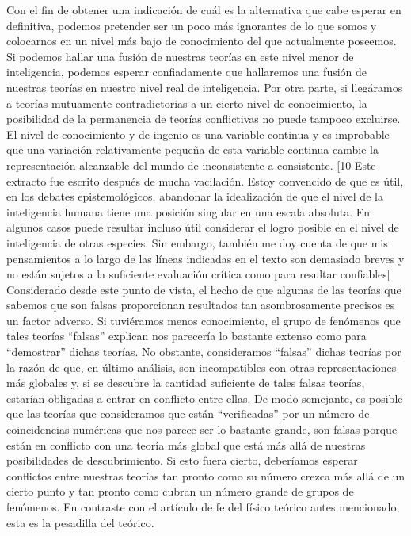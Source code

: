 \documentclass[a4paper, 12pt]{article}
\begin{document}
Con el fin de obtener una indicación de cuál es la alternativa que cabe esperar en definitiva, podemos pretender ser un poco más ignorantes de lo que somos y colocarnos en un nivel más bajo de conocimiento del que actualmente poseemos. Si podemos hallar una fusión de nuestras teorías en este nivel menor de inteligencia, podemos esperar confiadamente que hallaremos una fusión de nuestras teorías en nuestro nivel real de inteligencia. Por otra parte, si llegáramos a teorías mutuamente contradictorias a un cierto nivel de conocimiento, la posibilidad de la permanencia de teorías conflictivas no puede tampoco excluirse. El nivel de conocimiento y de ingenio es una variable continua y es improbable que una variación relativamente pequeña de esta variable continua cambie la representación alcanzable del mundo de inconsistente a consistente. [10 Este extracto fue escrito después de mucha vacilación. Estoy convencido de que es útil, en los debates epistemológicos, abandonar la idealización de que el nivel de la inteligencia humana tiene una posición singular en una escala absoluta. En algunos casos puede resultar incluso útil considerar el logro posible en el nivel de inteligencia de otras especies. Sin embargo, también me doy cuenta de que mis pensamientos a lo largo de las líneas indicadas en el texto son demasiado breves y no están sujetos a la suficiente evaluación crítica como para resultar confiables] Considerado desde este punto de vista, el hecho de que algunas de las teorías que sabemos que son falsas proporcionan resultados tan asombrosamente precisos es un factor adverso. Si tuviéramos menos conocimiento, el grupo de fenómenos que tales teorías ``falsas'' explican nos parecería lo bastante extenso como para ``demostrar'' dichas teorías. No obstante, consideramos ``falsas'' dichas teorías por la razón de que, en último análisis, son incompatibles con otras representaciones más globales y, si se descubre la cantidad suficiente de tales falsas teorías, estarían obligadas a entrar en conflicto entre ellas. De modo semejante, es posible que las teorías que consideramos que están ``verificadas'' por un número de coincidencias numéricas que nos parece ser lo bastante grande, son falsas porque están en conflicto con una teoría más global que está más allá de nuestras posibilidades de descubrimiento. Si esto fuera cierto, deberíamos esperar conflictos entre nuestras teorías tan pronto como su número crezca más allá de un cierto punto y tan pronto como cubran un número grande de grupos de fenómenos. En contraste con el artículo de fe del físico teórico antes mencionado, esta es la pesadilla del teórico.
\end{document}
